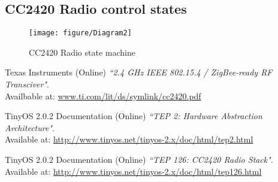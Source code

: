 \documentclass[a4paper,11pt]{article}
\begin{document}
  \subsection*{CC2420 Radio control states}

  \begin{figure}[h]
    \texttt{[image: figure/Diagram2]}
    \caption{CC2420 Radio state machine}
    \label{fig:statemachine}
  \end{figure}

\begin{thebibliography}{1}
  \footnotesize

    Texas Instruments (Online)
    \emph{``2.4 GHz IEEE 802.15.4 / ZigBee-ready RF Transciver"}. \\
    Availbable at:
    \url{www.ti.com/lit/ds/symlink/cc2420.pdf}

    TinyOS 2.0.2 Documentation (Online)
    \emph{``TEP 2: Hardware Abstraction Architecture"}. \\
    Available at:
    \url{http://www.tinyos.net/tinyos-2.x/doc/html/tep2.html}

    TinyOS 2.0.2 Documentation (Online)
    \emph{``TEP 126: CC2420 Radio Stack"}. \\
    Available at:
    \url{http://www.tinyos.net/tinyos-2.x/doc/html/tep126.html}

\end{thebibliography}
\end{document}
